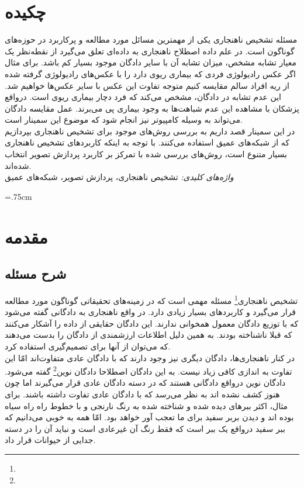 \documentclass[12pt,a4paper]{report}
\theoremstyle{definition}
\theoremstyle{theorem}
\theoremstyle{definition}
\begin{document}
	
	\chapter*{چکیده}
	مسئله تشخیص ناهنجاری یکی از مهمترین مسائل مورد مطالعه و پر‌کاربرد در حوزه‌های گوناگون است. در علم داده اصطلاح ناهنجاری به داده‌ای تعلق می‌گیرد از نقطه‌نظر یک معیار تشابه مشخص، میزان تشابه آن با سایر دادگان موجود بسیار کم باشد. برای مثال اگر عکس رادیولوژی فردی که بیماری ریوی دارد را با عکس‌های رادیولوژی گرفته شده از ریه افراد سالم مقایسه کنیم متوجه تفاوت این عکس با سایر عکس‌ها خواهیم شد. این عدم تشابه در دادگان، مشخص می‌کند  که فرد دچار بیماری ریوی است. درواقع پزشکان با مشاهده این عدم شباهت‌ها به وجود بیماری پی می‌برند. عمل مقایسه دادگان می‌تواند به وسیله کامپیوتر نیز انجام شود که موضوع این سمینار است.\\
در این سمینار قصد داریم به بررسی روش‌های موجود برای تشخیص ناهنجاری بپردازیم که از شبکه‌های عمیق استفاده می‌کنند. با توجه به اینکه کاربر‌دهای تشخیص ناهنجاری بسیار متنوع است، روش‌های بررسی شده با تمرکز بر کاربرد پردازش تصویر انتخاب شده‌اند.\\

	\textit{
واژه‌های کلیدی:
	}
	تشخیص ناهنجاری، پردازش تصویر، شبکه‌های عمیق

	\newpage
	\baselineskip=1cm
	\tableofcontents
	\listoffigures
	\listoftables
	\newpage
	\baselineskip=.75cm
	\chapter{مقدمه}
	\section{شرح مسئله}

   تشخیص ناهنجاری‌\footnote{} مسئله مهمی است که در زمینه‌های تحقیقاتی گوناگون مورد مطالعه قرار می‌گیرد و کاربرد‌های بسیار زیادی دارد. در واقع ناهنجاری به دادگانی گفته می‌شود که با توزیع دادگان معمول همخوانی ندارند. این دادگان حقایقی از داده را آشکار می‌کنند که قبلا ناشناخته بودند. به همین دلیل اطلاعات ارزشمندی از دادگان را بدست می‌دهند که می‌توان از آنها برای تصمیم‌گیری‌ استفاده کرد.\\

در کنار ناهنجاری‌ها، دادگان دیگری نیز وجود دارند که با دادگان عادی متفاوت‌اند امّا این تفاوت به اندازی کافی زیاد نیست. به این دادگان اصطلاحا دادگان نوین\footnote{} گفته می‌شود. دادگان نوین درواقع دادگانی هستند که در دسته دادگان عادی قرار می‌گیرند اما چون هنوز کشف نشده اند به نظر می‌رسد که با دادگان عادی تفاوت داشته باشند. برای مثال، اکثر ببر‌های دیده شده و شناخته شده به رنگ نارنجی و با خطوط راه راه سیاه بوده اند و دیدن بربر سفید برای ما تعجب آور خواهد بود. امّا همه به خوبی می‌دانیم که ببر سفید درواقع یک ببر است که فقط رنگ آن غیرعادی است و نباید آن را در دسته جدایی از حیوانات قرار داد. \\
\end{document}
